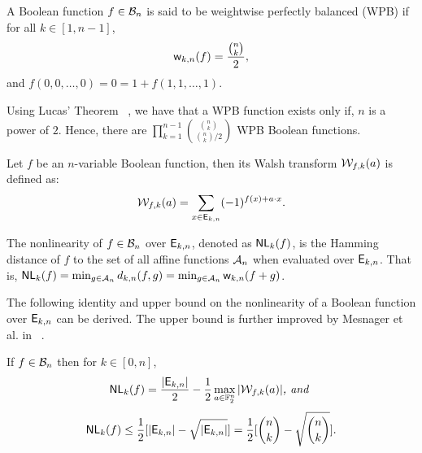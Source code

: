 \documentclass{llncs}
\begin{document}
\begin{definition}\label{def:WPB}
A Boolean function $f \in \mathcal{B}_n$ is said to be weightwise perfectly balanced (WPB) if for all $k \in [1,n-1]$, 
\[\mathsf{w}_{k,n}(f) = \frac{{n \choose k}}{2},\]
and $f(0,0,\ldots,0)=0=1+f(1,1,\ldots,1)$.
\end{definition}

Using Lucas' Theorem \eg~\cite{AMM:F47}, we have that a WPB function exists only if, $n$ is a power of $2$. Hence, there are $\displaystyle {\prod_{k = 1}^{n-1} {{{n \choose k}} \choose {{n \choose k}/2}}}$ WPB Boolean functions.

\begin{definition}\label{def:restWalsh}
Let $f$ be an $n$-variable Boolean function, then its Walsh transform $\mathcal{W}_{f,k}(a)$ is defined as:
\[\mathcal{W}_{f,k}(a) = \sum_{x \in \mathsf{E}_{k,n}} (-1)^{f(x)+ a \cdot x}.\]
\end{definition}

\begin{definition}\label{def:wtNl}
The nonlinearity of $f \in \mathcal{B}_n$ over $\mathsf{E}_{k,n}$, denoted as $\mathsf{NL}_{k}(f)$, is the Hamming distance of $f$ to the set of all affine functions $\mathcal{A}_n$ when evaluated over $\mathsf{E}_{k,n}$. 
That is, $\mathsf{NL}_{k}(f) = \min_{g \in \mathcal{A}_n} d_{k,n}(f,g) = \min_{g \in \mathcal{A}_n} \mathsf{w}_{k,n}(f+g)$.\\
\end{definition}

The following identity and upper bound on the nonlinearity of a Boolean function over $\mathsf{E}_{k,n}$ can be derived. The upper bound is further improved by Mesnager et al. in ~\cite{CC:MesZhoDin19}.
\begin{lemma}\label{lem:wnl}
If $f \in \mathcal{B}_n$ then for $k \in [0,n]$, 
\[\mathsf{NL}_{k}(f) = \frac{|\mathsf{E}_{k,n}|}{2}- \frac{1}{2}\max_{a \in \mathbb{F}_2^n} |\mathcal{W}_{f,k}(a)| \textit{, and } \]
\[\mathsf{NL}_{k}(f) \leq \frac{1}{2} [|\mathsf{E}_{k,n}| - \sqrt{|\mathsf{E}_{k,n}|}] = \frac{1}{2} [{n \choose k} - \sqrt{{n \choose k}}].\]
\end{lemma}

\end{document}
